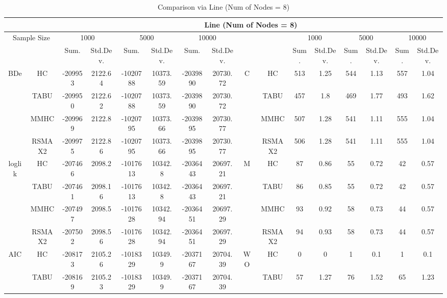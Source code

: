 \begin{table}[p]																										
\centering	\caption{Comparison via Line (Num of Nodes = 8)}	\tiny																						
{\tabcolsep=0.01in																										
\begin{tabular}{cc||cc|cc|cc||cc|cc|cc|cc}																										
\hline																										
&	&	\multicolumn{14}{c}{Line	(Num	of	Nodes	=	8)}\tabularnewline																			
\hline																										
\multicolumn{2}{c||}{Sample	Size}	&	\multicolumn{2}{c|}{1000}	&	\multicolumn{2}{c|}{5000}	&	\multicolumn{2}{c||}{10000}	&	&	&	\multicolumn{2}{c|}{1000}	&	\multicolumn{2}{c|}{5000}	&	\multicolumn{2}{c}{10000}\tabularnewline											
\hline																										
&	&	Sum.	&	Std.Dev.	&	Sum.	&	Std.Dev.	&	Sum.	&	Std.Dev.	&	&	&	Sum.	&	Std.Dev.	&	Sum.	&	Std.Dev.	&	Sum.	&	Std.Dev.\tabularnewline
\hline																										
\hline																										
\multirow{4}{*}{BDe} & HC &	-209953 & 	2122.64 & 	-1020788 & 	10373.59 & 	-2039890 & 	20730.72 & 	\multirow{4}{*}{C} & HC &	513 & 	1.25 & 	544 & 	1.13 & 	557 & 	1.04\tabularnewline													
& TABU &	-209950 & 	2122.62 & 	-1020788 & 	10373.59 & 	-2039890 & 	20730.72 & 	& TABU &	457 & 	1.8 & 	469 & 	1.77 & 	493 & 	1.62\tabularnewline													
& MMHC &	-209969 & 	2122.8 & 	-1020795 & 	10373.66 & 	-2039895 & 	20730.77 & 	& MMHC &	507 & 	1.28 & 	541 & 	1.11 & 	555 & 	1.04\tabularnewline													
& RSMAX2 &	-209975 & 	2122.86 & 	-1020795 & 	10373.66 & 	-2039895 & 	20730.77 & 	& RSMAX2 &	506 & 	1.28 & 	541 & 	1.11 & 	555 & 	1.04\tabularnewline													
\hline																										
\multirow{4}{*}{loglik} & HC &	-207466 & 	2098.2 & 	-1017613 & 	10342.8 & 	-2036443 & 	20697.21 & 	\multirow{4}{*}{M} & HC &	87 & 	0.86 & 	55 & 	0.72 & 	42 & 	0.57\tabularnewline													
& TABU &	-207461 & 	2098.16 & 	-1017613 & 	10342.8 & 	-2036443 & 	20697.21 & 	& TABU &	86 & 	0.85 & 	55 & 	0.72 & 	42 & 	0.57\tabularnewline													
& MMHC &	-207497 & 	2098.5 & 	-1017628 & 	10342.94 & 	-2036451 & 	20697.29 & 	& MMHC &	93 & 	0.92 & 	58 & 	0.73 & 	44 & 	0.57\tabularnewline													
& RSMAX2 &	-207502 & 	2098.56 & 	-1017628 & 	10342.94 & 	-2036451 & 	20697.29 & 	& RSMAX2 &	94 & 	0.93 & 	58 & 	0.73 & 	44 & 	0.57\tabularnewline													
\hline																										
\multirow{4}{*}{AIC} & HC &	-208173 & 	2105.26 & 	-1018329 & 	10349.9 & 	-2037167 & 	20704.39 & 	\multirow{4}{*}{WO} & HC &	0 & 	0 & 	1 & 	0.1 & 	1 & 	0.1\tabularnewline													
& TABU &	-208169 & 	2105.23 & 	-1018329 & 	10349.9 & 	-2037167 & 	20704.39 & 	& TABU &	57 & 	1.27 & 	76 & 	1.52 & 	65 & 	1.23\tabularnewline													

\end{tabular}}
\end{table}
